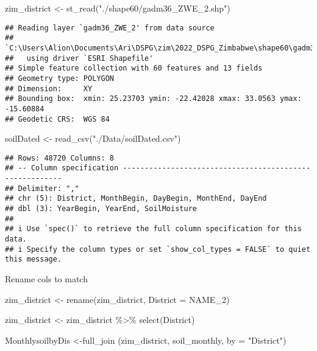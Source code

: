 \documentclass[
]{article}
\newenvironment{Shaded}{\begin{snugshade}}{\end{snugshade}}
\newcommand{\AttributeTok}[1]{\textcolor[rgb]{0.77,0.63,0.00}{#1}}
\newcommand{\FunctionTok}[1]{\textcolor[rgb]{0.00,0.00,0.00}{#1}}
\newcommand{\NormalTok}[1]{#1}
\newcommand{\OtherTok}[1]{\textcolor[rgb]{0.56,0.35,0.01}{#1}}
\newcommand{\SpecialCharTok}[1]{\textcolor[rgb]{0.00,0.00,0.00}{#1}}
\newcommand{\StringTok}[1]{\textcolor[rgb]{0.31,0.60,0.02}{#1}}
\begin{document}
\begin{Shaded}
\begin{Highlighting}[]
\NormalTok{zim\_district }\OtherTok{\textless{}{-}} \FunctionTok{st\_read}\NormalTok{(}\StringTok{"./shape60/gadm36\_ZWE\_2.shp"}\NormalTok{)  }
\end{Highlighting}
\end{Shaded}

\begin{verbatim}
## Reading layer `gadm36_ZWE_2' from data source 
##   `C:\Users\Alion\Documents\Ari\DSPG\zim\2022_DSPG_Zimbabwe\shape60\gadm36_ZWE_2.shp' 
##   using driver `ESRI Shapefile'
## Simple feature collection with 60 features and 13 fields
## Geometry type: POLYGON
## Dimension:     XY
## Bounding box:  xmin: 25.23703 ymin: -22.42028 xmax: 33.0563 ymax: -15.60884
## Geodetic CRS:  WGS 84
\end{verbatim}

\begin{Shaded}
\begin{Highlighting}[]
\NormalTok{soilDated }\OtherTok{\textless{}{-}} \FunctionTok{read\_csv}\NormalTok{(}\StringTok{"./Data/soilDated.csv"}\NormalTok{) }
\end{Highlighting}
\end{Shaded}

\begin{verbatim}
## Rows: 48720 Columns: 8
## -- Column specification --------------------------------------------------------
## Delimiter: ","
## chr (5): District, MonthBegin, DayBegin, MonthEnd, DayEnd
## dbl (3): YearBegin, YearEnd, SoilMoisture
## 
## i Use `spec()` to retrieve the full column specification for this data.
## i Specify the column types or set `show_col_types = FALSE` to quiet this message.
\end{verbatim}

Rename cols to match

\begin{Shaded}
\begin{Highlighting}[]
\NormalTok{zim\_district }\OtherTok{\textless{}{-}} \FunctionTok{rename}\NormalTok{(zim\_district, }\AttributeTok{District =}\NormalTok{ NAME\_2)}
\end{Highlighting}
\end{Shaded}

\begin{Shaded}
\begin{Highlighting}[]
\NormalTok{zim\_district }\OtherTok{\textless{}{-}}\NormalTok{ zim\_district }\SpecialCharTok{\%\textgreater{}\%} 
  \FunctionTok{select}\NormalTok{(District)}

\NormalTok{MonthlysoilbyDis }\OtherTok{\textless{}{-}}\FunctionTok{full\_join}\NormalTok{ (zim\_district, soil\_monthly, }\AttributeTok{by =} \StringTok{"District"}\NormalTok{)}
\end{Highlighting}
\end{Shaded}
\end{document}
